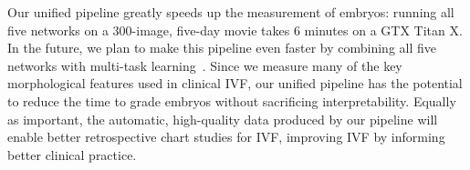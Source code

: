 
Our unified pipeline greatly speeds up the measurement of embryos: running all five networks on a 300-image, five-day movie takes 6 minutes on a GTX Titan X. In the future, we plan to make this pipeline even faster by combining all five networks with multi-task learning~\cite{dai2016instance}. Since we measure many of the key morphological features used in clinical IVF, our unified pipeline has the potential to reduce the time to grade embryos without sacrificing interpretability. Equally as important, the automatic, high-quality data produced by our pipeline will enable better retrospective chart studies for IVF, improving IVF by informing better clinical practice.

